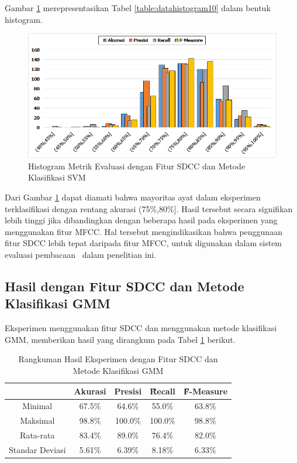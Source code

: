   Gambar \ref{fig:histogram10} merepresentasikan Tabel \ref{table:datahistogram10} dalam bentuk histogram.
  \begin{figure}
    \centering
    \includegraphics[width=\linewidth]{pics/histogram10}
    \caption{Histogram Metrik Evaluasi dengan Fitur SDCC dan Metode Klasifikasi SVM}
    \label{fig:histogram10}
  \end{figure}

  Dari Gambar \ref{fig:histogram10} dapat diamati bahwa mayoritas ayat dalam eksperimen terklasifikasi dengan rentang akurasi (75\%,80\%]. Hasil tersebut secara signifikan lebih tinggi jika dibandingkan dengan beberapa hasil pada eksperimen yang menggunakan fitur MFCC. Hal tersebut mengindikasikan bahwa penggunaan fitur SDCC lebih tepat daripada fitur MFCC, untuk digunakan dalam sistem evaluasi pembacaan \quran~dalam penelitian ini.





  \subsection{Hasil dengan Fitur SDCC dan Metode Klasifikasi GMM}
  Eksperimen menggunakan fitur SDCC dan menggunakan metode klasifikasi GMM, memberikan hasil yang dirangkum pada Tabel \ref{table:sdccgmm} berikut.

  \begin{table}
    \centering
    \caption{Rangkuman Hasil Eksperimen dengan Fitur SDCC dan Metode Klasifikasi GMM}
    \begin{tabular}{|c|c|c|c|c|}
      \hline
       & Akurasi & Presisi & \f{\f{Recall}} & \f{\f{F-Measure}} \\ \hline
      Minimal         & 67.5\% & 64.6\%  & 55.0\%  & 63.8\% \\ \hline
      Maksimal        & 98.8\% & 100.0\% & 100.0\% & 98.8\% \\ \hline
      Rata-rata       & 83.4\% & 89.0\%  & 76.4\%  & 82.0\% \\ \hline
      Standar Deviasi & 5.61\% & 6.39\% & 8.18\% & 6.33\%  \\ \hline
    \end{tabular}
    \label{table:sdccgmm}
  \end{table}

